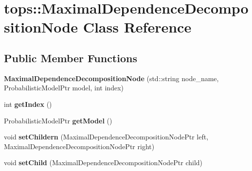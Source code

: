 \hypertarget{classtops_1_1MaximalDependenceDecompositionNode}{}\section{tops\+:\+:Maximal\+Dependence\+Decomposition\+Node Class Reference}
\label{classtops_1_1MaximalDependenceDecompositionNode}
\subsection*{Public Member Functions}
\begin{DoxyCompactItemize}
\item 
\mbox{\label{classtops_1_1MaximalDependenceDecompositionNode_acd44c4621f84b6b261cbfefcc158a16f}} 
{\bfseries Maximal\+Dependence\+Decomposition\+Node} (std\+::string node\+\_\+name, Probabilistic\+Model\+Ptr model, int index)
\item 
\mbox{\label{classtops_1_1MaximalDependenceDecompositionNode_a1cbd644d25b55b89665f87a471657247}} 
int {\bfseries get\+Index} ()
\item 
\mbox{\label{classtops_1_1MaximalDependenceDecompositionNode_af49cdc33759504f8ece143f38a9b071d}} 
Probabilistic\+Model\+Ptr {\bfseries get\+Model} ()
\item 
\mbox{\label{classtops_1_1MaximalDependenceDecompositionNode_ad4a3672eec92ad4fe2ca905e403657a3}} 
void {\bfseries set\+Childern} (Maximal\+Dependence\+Decomposition\+Node\+Ptr left, Maximal\+Dependence\+Decomposition\+Node\+Ptr right)
\item 
\mbox{\label{classtops_1_1MaximalDependenceDecompositionNode_ad18ebb6bc873391928da938a31181004}} 
void {\bfseries set\+Child} (Maximal\+Dependence\+Decomposition\+Node\+Ptr child)
\item 
\mbox{\label{classtops_1_1MaximalDependenceDecompositionNode_a2e15fb60552d012797851e17993923ff}} 

\end{DoxyCompactItemize}
